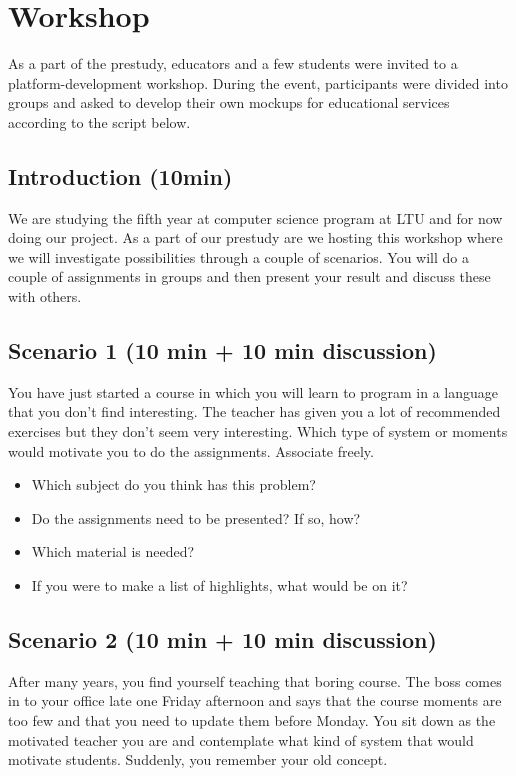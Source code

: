 \chapter{Workshop}
\label{sec:workshop}
As a part of the prestudy, educators and a few students were invited to a platform-development workshop. During the event, participants were divided into groups and asked to develop their own mockups for educational services according to the script below.

\section*{Introduction (10min)}
We are studying the fifth year at computer science program at LTU and for now doing our project. As a part of our prestudy are we hosting this workshop where we will investigate possibilities through a couple of scenarios. You will do a couple of assignments in groups and then present your result and discuss these with others.

\section*{Scenario 1 (10 min + 10 min discussion)}
You have just started a course in which you will learn to program in a language that you don't find interesting. The teacher has given you a lot of recommended exercises but they don't seem very interesting. Which type of system or moments would motivate you to do the assignments. Associate freely.
\begin{itemize}
\item Which subject do you think has this problem?
\item Do the assignments need to be presented? If so, how?
\item Which material is needed?
\item If you were to make a list of highlights, what would be on it?
\end{itemize} 

\section*{Scenario 2 (10 min + 10 min discussion)}
After many years, you find yourself teaching that boring course. The boss comes in to your office late one Friday afternoon and says that the course moments are too few and that you need to update them before Monday. You sit down as the motivated teacher you are and contemplate what kind of system that would motivate students. Suddenly, you remember your old concept.

